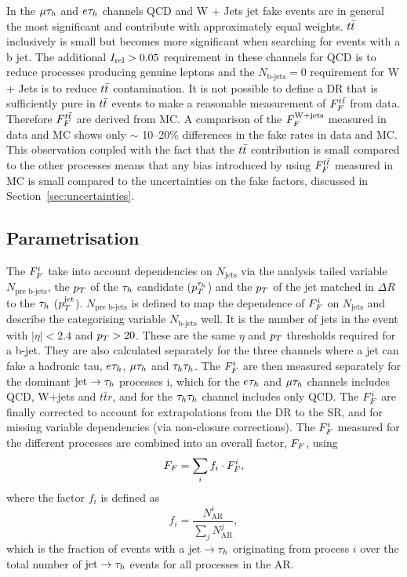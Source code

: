 In the $\mu\tau_{h}$ and $e\tau_{h}$ channels QCD and W + Jets jet fake events are in general the most significant and contribute with approximately equal weights. 
$t\bar{t}$ inclusively is small but becomes more significant when searching for events with a b jet. 
The additional $I_{\text{rel}}>0.05$ requirement in these channels for QCD is to reduce processes producing genuine leptons and the $N_{\text{b-jets}}=0$ requirement for W + Jets is to reduce $t\bar{t}$ contamination.
It is not possible to define a DR that is sufficiently pure in $t\bar{t}$ events to make a reasonable measurement of $F_{F}^{t\bar{t}}$ from data.
Therefore $F_{F}^{t\bar{t}}$ are derived from MC. 
A comparison of the $F_{F}^{\text{W+jets}}$ measured in data and MC shows only $\sim$ 10--20\% differences in the fake rates in data and MC.  
This observation coupled with the fact that the $t\bar{t}$ contribution is small compared to the other processes means that any bias introduced by using $F_{F}^{t\bar{t}}$ measured in MC is small compared to the uncertainties on the fake factors, discussed in Section~\ref{sec:uncertainties}. \\


\subsection{Parametrisation}

The $F_{F}^{i}$ take into account dependencies on $N_{\text{jets}}$ via the analysis tailed variable $N_{\text{pre b-jets}}$, the $p_{T}$ of the $\tau_{h}$ candidate ($p_{T}^{\tau_{h}}$) and the $p_{T}$ of the jet matched in $\Delta R$ to the $\tau_{h}$ ($p_{T}^{\text{jet}}$).
$N_{\text{pre b-jets}}$ is defined to map the dependence of $F_{F}^{i}$ on $N_{\text{jets}}$ and describe the categorising variable $N_{\text{b-jets}}$ well.
It is the number of jets in the event with $|\eta|<2.4$ and $p_{T}>20$. These are the same $\eta$ and $p_{T}$ thresholds required for a b-jet.
They are also calculated separately for the three channels where a jet can fake a hadronic tau, $e\tau_{h}$, $\mu\tau_{h}$ and $\tau_{h}\tau_{h}$.
The $F_{F}^{i}$ are then measured separately for the dominant $\text{jet}\rightarrow\tau_{h}$ processes $\text{i}$, which for the $e\tau_{h}$ and $\mu\tau_{h}$ channels includes QCD, W+jets and $t\bar{t}r$, and for the $\tau_{h}\tau_{h}$ channel includes only QCD.
The $F_{F}^{i}$ are finally corrected to account for extrapolations from the DR to the SR, and for missing variable dependencies (via non-closure corrections).
The $F_{F}^{i}$ measured for the different processes are combined into an overall factor, $F_{F}$, using
\begin{equation}
F_{F} = \sum_{i}f_{i}\cdot F_{F}^{i},
\end{equation}
where the factor $f_{i}$ is defined as
\begin{equation}
f_{i} = \frac{N_{\text{AR}}^{i}}{\sum\limits_{j}N_{\text{AR}}^{j}},
\end{equation}
which is the fraction of events with a $\text{jet}\rightarrow\tau_{h}$ originating from process $i$ over the total number of $\text{jet}\rightarrow\tau_{h}$ events for all processes in the AR.

